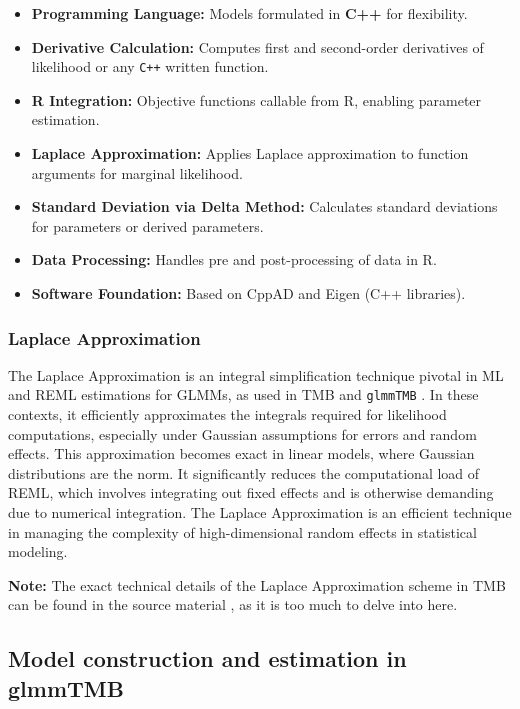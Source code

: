 \documentclass[12pt, twoside,hidelinks]{article}
\theoremstyle{definition}
\numberwithin{equation}{section}
\begin{document}
\begin{itemize}
    \item \textbf{Programming Language:} Models formulated in \textbf{C++} for flexibility.
    \item \textbf{Derivative Calculation:} Computes first and second-order derivatives of likelihood or any \texttt{C++} written function.
    \item \textbf{R Integration:} Objective functions callable from R, enabling parameter estimation.
    \item \textbf{Laplace Approximation:} Applies Laplace approximation to function arguments for marginal likelihood.
    \item \textbf{Standard Deviation via Delta Method:} Calculates standard deviations for parameters or derived parameters.
    \item \textbf{Data Processing:} Handles pre and post-processing of data in R.
    \item \textbf{Software Foundation:} Based on CppAD and Eigen (C++ libraries).
\end{itemize}

\subsubsection{Laplace Approximation}

The Laplace Approximation is an integral simplification technique pivotal in ML and REML estimations for GLMMs, as used in TMB and \texttt{glmmTMB} \cite{TMB}. In these contexts, it efficiently approximates the integrals required for likelihood computations, especially under Gaussian assumptions for errors and random effects. This approximation becomes exact in linear models, where Gaussian distributions are the norm. It significantly reduces the computational load of REML, which involves integrating out fixed effects and is otherwise demanding due to numerical integration. The Laplace Approximation is an efficient technique in managing the complexity of high-dimensional random effects in statistical modeling. 

\textbf{Note:} The exact technical details of the Laplace Approximation scheme in TMB can be found in the source material \cite{TMB}, as it is too much to delve into here. 

\subsection{Model construction and estimation in glmmTMB}
\end{document}
